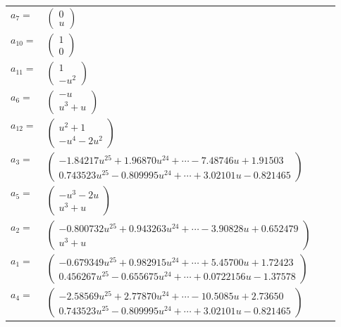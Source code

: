 \documentclass[1p]{elsarticle_modified}
\theoremstyle{definition}
\begin{document}
\begin{tabular}{m{7pt} m{180pt} m{7pt} m{180pt} }
\flushright $a_{7}=$&$\begin{pmatrix}0\\u\end{pmatrix}$ \\
\flushright $a_{10}=$&$\begin{pmatrix}1\\0\end{pmatrix}$ \\
\flushright $a_{11}=$&$\begin{pmatrix}1\\- u^2\end{pmatrix}$ \\
\flushright $a_{6}=$&$\begin{pmatrix}- u\\u^3+u\end{pmatrix}$ \\
\flushright $a_{12}=$&$\begin{pmatrix}u^2+1\\- u^4-2 u^2\end{pmatrix}$ \\
\flushright $a_{3}=$&$\begin{pmatrix}-1.84217 u^{25}+1.96870 u^{24}+\cdots-7.48746 u+1.91503\\0.743523 u^{25}-0.809995 u^{24}+\cdots+3.02101 u-0.821465\end{pmatrix}$ \\
\flushright $a_{5}=$&$\begin{pmatrix}- u^3-2 u\\u^3+u\end{pmatrix}$ \\
\flushright $a_{2}=$&$\begin{pmatrix}-0.800732 u^{25}+0.943263 u^{24}+\cdots-3.90828 u+0.652479\\u^3+u\end{pmatrix}$ \\
\flushright $a_{1}=$&$\begin{pmatrix}-0.679349 u^{25}+0.982915 u^{24}+\cdots+5.45700 u+1.72423\\0.456267 u^{25}-0.655675 u^{24}+\cdots+0.0722156 u-1.37578\end{pmatrix}$ \\
\flushright $a_{4}=$&$\begin{pmatrix}-2.58569 u^{25}+2.77870 u^{24}+\cdots-10.5085 u+2.73650\\0.743523 u^{25}-0.809995 u^{24}+\cdots+3.02101 u-0.821465\end{pmatrix}$ \\

\end{tabular}
\end{document}
